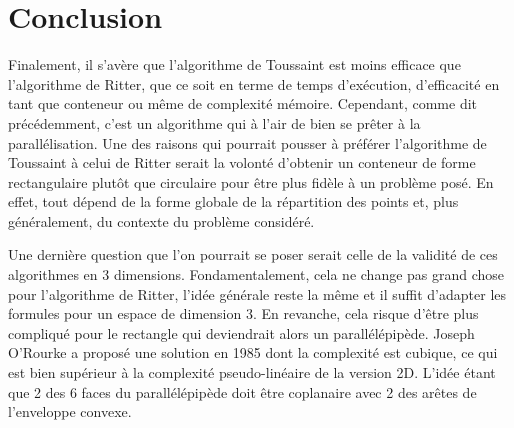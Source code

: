 \section{Conclusion}
Finalement, il s'avère que l'algorithme de Toussaint est moins efficace que l'algorithme de Ritter, que ce soit en terme de temps d'exécution, d'efficacité en tant que conteneur ou même de complexité mémoire. Cependant, comme dit précédemment, c'est un algorithme qui à l'air de bien se prêter à la parallélisation. Une des raisons qui pourrait pousser à préférer l'algorithme de Toussaint à celui de Ritter serait la volonté d'obtenir un conteneur de forme rectangulaire plutôt que circulaire pour être plus fidèle à un problème posé. En effet, tout dépend de la forme globale de la répartition des points et, plus généralement, du contexte du problème considéré.

Une dernière question que l'on pourrait se poser serait celle de la validité de ces algorithmes en 3 dimensions. Fondamentalement, cela ne change pas grand chose pour l'algorithme de Ritter, l'idée générale reste la même et il suffit d'adapter les formules pour un espace de dimension 3. En revanche, cela risque d'être plus compliqué pour le rectangle qui deviendrait alors un parallélépipède. Joseph O'Rourke a proposé une solution en 1985 dont la complexité est cubique, ce qui est bien supérieur à la complexité pseudo-linéaire de la version 2D. L'idée étant que 2 des 6 faces du parallélépipède doit être coplanaire avec 2 des arêtes de l'enveloppe convexe.